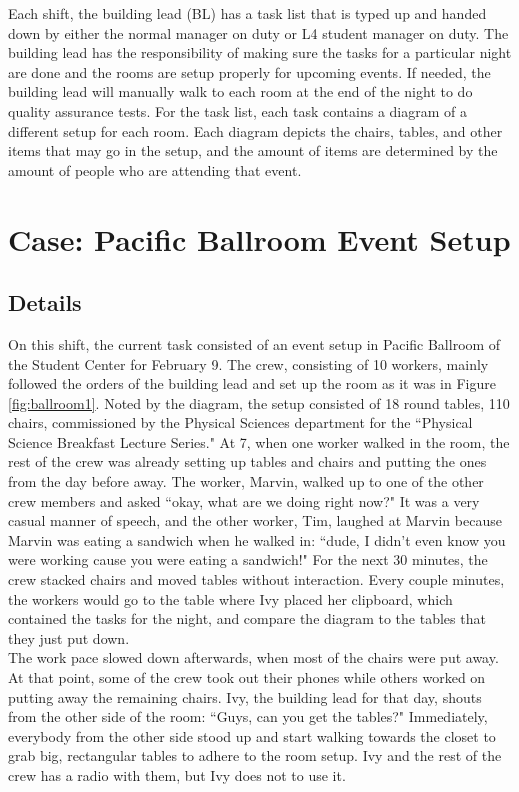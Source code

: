 \documentclass[letterpaper, 12pt]{report}
\begin{document}
Each shift, the building lead (BL) has a task list that is typed up and handed down by either the normal manager on duty or L4 student manager on duty. The building lead has the responsibility of making sure the tasks for a particular night are done and the rooms are setup properly for upcoming events. If needed, the building lead will manually walk to each room at the end of the night to do quality assurance tests. For the task list, each task contains a diagram of a different setup for each room. Each diagram depicts the chairs, tables, and other items that may go in the setup, and the amount of items are determined by the amount of people who are attending that event.

\section{Case: Pacific Ballroom Event Setup}
\subsection{Details}
On this shift, the current task consisted of an event setup in Pacific Ballroom of the Student Center for February 9. The crew, consisting of 10 workers, mainly followed the orders of the building lead and set up the room as it was in Figure \ref{fig:ballroom1}. Noted by the diagram, the setup consisted of 18 round tables, 110 chairs, commissioned by the Physical Sciences department for the ``Physical Science Breakfast Lecture Series." At 7, when one worker walked in the room, the rest of the crew was already setting up tables and chairs and putting the ones from the day before away. The worker, Marvin, walked up to one of the other crew members and asked ``okay, what are we doing right now?" It was a very casual manner of speech, and the other worker, Tim, laughed at Marvin because Marvin was eating a sandwich when he walked in: ``dude, I didn't even know you were working cause you were eating a sandwich!" For the next 30 minutes, the crew stacked chairs and moved tables without interaction. Every couple minutes, the workers would go to the table where Ivy placed her clipboard, which contained the tasks for the night, and compare the diagram to the tables that they just put down.\\

The work pace slowed down afterwards, when most of the chairs were put away. At that point, some of the crew took out their phones while others worked on putting away the remaining chairs. Ivy, the building lead for that day, shouts from the other side of the room: ``Guys, can you get the tables?" Immediately, everybody from the other side stood up and start walking towards the closet to grab big, rectangular tables to adhere to the room setup. Ivy and the rest of the crew has a radio with them, but Ivy does not to use it.\\
\end{document}
